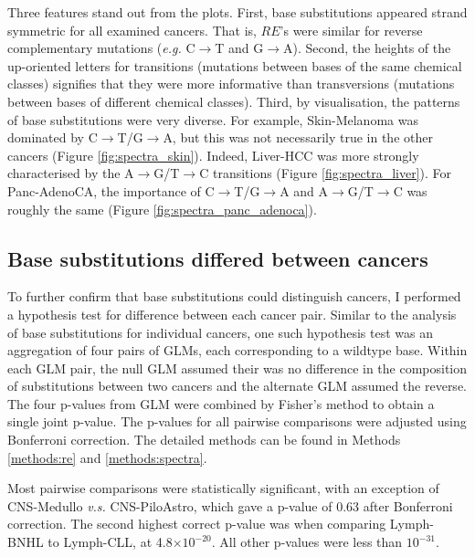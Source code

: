 

Three features stand out from the plots. First, base substitutions appeared strand symmetric for all examined cancers. That is, $RE$'s were similar for reverse complementary mutations (\textit{e.g.} C$\rightarrow$T and G$\rightarrow$A). Second, the heights of the up-oriented letters for \glspl{transition} (mutations between bases of the same chemical classes) signifies that they were more informative than \glspl{transversion} (mutations between bases of different chemical classes). Third, by visualisation, the patterns of base substitutions were very diverse. For example, Skin-Melanoma was dominated by C$\rightarrow$T/G$\rightarrow$A, but this was not necessarily true in the other cancers (Figure \ref{fig:spectra_skin}). Indeed, Liver-HCC was more strongly characterised by the A$\rightarrow$G/T$\rightarrow$C transitions (Figure \ref{fig:spectra_liver}). For Panc-AdenoCA, the importance of C$\rightarrow$T/G$\rightarrow$A and A$\rightarrow$G/T$\rightarrow$C was roughly the same (Figure \ref{fig:spectra_panc_adenoca}).



\subsection{Base substitutions differed between cancers}\label{sce:paired_spectra}
To further confirm that base substitutions could distinguish cancers, I performed a hypothesis test for difference between each cancer pair. Similar to the analysis of base substitutions for individual cancers, one such hypothesis test was an aggregation of four pairs of GLMs, each corresponding to a wildtype base. Within each GLM pair, the null GLM assumed their was no difference in the composition of substitutions between two cancers and the alternate GLM assumed the reverse. The four p-values from GLM were combined by Fisher's method to obtain a single joint p-value. The p-values for all pairwise comparisons were adjusted using Bonferroni correction. The detailed methods can be found in Methods \ref{methods:re} and \ref{methods:spectra}.

Most pairwise comparisons were statistically significant, with an exception of CNS-Medullo \textit{v.s.} CNS-PiloAstro, which gave a p-value of 0.63 after Bonferroni correction. The second highest correct p-value was when comparing Lymph-BNHL to Lymph-CLL, at 4.8$\times10^{-20}$. All other p-values were less than $10^{-31}$. 

